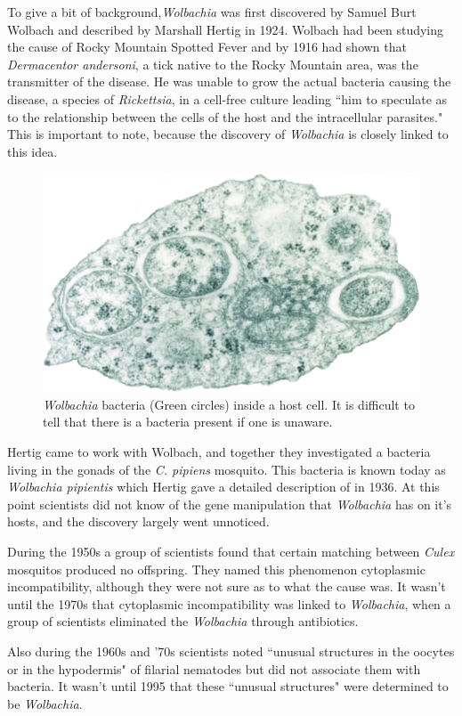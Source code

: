 \documentclass[twocolumn]{article}
\begin{document}
To give a bit of background,\textit{Wolbachia} was first discovered by Samuel Burt Wolbach and described by Marshall Hertig in 1924.\cite{Winit} Wolbach had been studying the cause of Rocky Mountain Spotted Fever and by 1916 had shown that \textit{Dermacentor andersoni}, a tick native to the Rocky Mountain area, was the transmitter of the disease.\cite{wolbachia} He was unable to grow the actual bacteria causing the disease, a species of \textit{Rickettsia}, in a cell-free culture leading ``him to speculate as to the relationship between the cells of the host and the intracellular parasites."\cite{wolbachia} This is important to note, because the discovery of \textit{Wolbachia} is closely linked to this idea.

\begin{figure}[!ht]
    \centering
    \includegraphics[width=.4\textwidth]{images/Wolbachia.png}
    \caption{\textit{Wolbachia} bacteria (Green circles) inside a host cell. It is difficult to tell that there is a bacteria present if one is unaware.\cite{Wwiki_image} }
    \label{fig:wolbachiha_tree}
\end{figure}

Hertig came to work with Wolbach, and together they investigated a bacteria living in the gonads of the \textit{C. pipiens} mosquito. This bacteria is known today as \textit{Wolbachia pipientis} which Hertig gave a detailed description of in 1936.\cite{Wdiscription} At this point scientists did not know of the gene manipulation that \textit{Wolbachia} has on it's hosts, and the discovery largely went unnoticed.

During the 1950s a group of scientists found that certain matching between \textit{Culex} mosquitos produced no offspring. They named this phenomenon cytoplasmic incompatibility, although they were not sure as to what the cause was.\cite{Wcyto_iso} It wasn't until the 1970s that cytoplasmic incompatibility was linked to \textit{Wolbachia}, when a group of scientists eliminated the \textit{Wolbachia} through antibiotics.\cite{Wcyto_cause}

Also during the 1960s and '70s scientists noted ``unusual structures in the oocytes or in the hypodermis" of filarial nematodes but did not associate them with bacteria.\cite{wolbachia} It wasn't until 1995 that these ``unusual structures" were determined to be \textit{Wolbachia}.\cite{Wstruct} 
\end{document}
